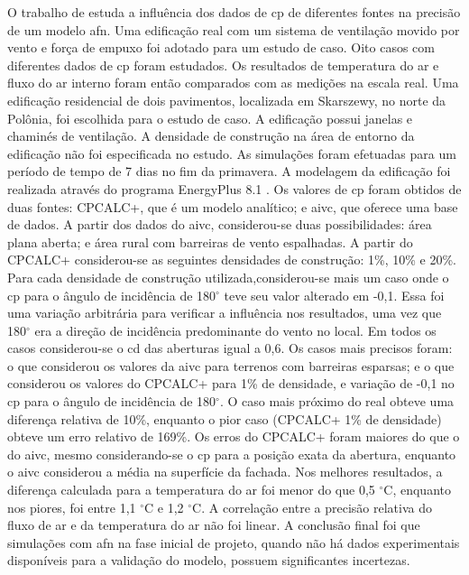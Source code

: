O trabalho de  estuda a influência dos dados de \acrshort{cp} de diferentes fontes na precisão de um modelo \acrshort{afn}. Uma edificação real com um sistema de ventilação movido por vento e força de empuxo foi adotado para um estudo de caso. Oito casos com diferentes dados de \acrshort{cp} foram estudados. Os resultados de temperatura do ar e fluxo do ar interno foram então comparados com as medições na escala real. Uma edificação residencial de dois pavimentos, localizada em Skarszewy, no norte da Polônia, foi escolhida para o estudo de caso. A edificação possui janelas e chaminés de ventilação. A densidade de construção na área de entorno da edificação não foi especificada no estudo. As simulações foram efetuadas para um período de tempo de 7 dias no fim da primavera. 
A modelagem da edificação foi realizada através do programa EnergyPlus 8.1 \cite{EnergyPlus2015}. Os valores de \acrshort{cp} foram obtidos de duas fontes: CPCALC+, que é um modelo analítico; e \acrshort{aivc}, que oferece uma base de dados. A partir dos dados do \acrshort{aivc}, considerou-se duas possibilidades: área plana aberta; e área rural com barreiras de vento espalhadas. A partir do CPCALC+ considerou-se as seguintes densidades de construção: 1\%, 10\% e 20\%. Para cada densidade de construção utilizada,considerou-se mais um caso onde o \acrshort{cp} para o ângulo de incidência de 180$^{\circ}$ teve seu valor alterado em -0,1. Essa foi uma variação arbitrária para verificar a influência nos resultados, uma vez que 180$^{\circ}$ era a direção de incidência predominante do vento no local. Em todos os casos considerou-se o \acrfull{cd} das aberturas igual a 0,6. 
Os casos mais precisos foram: o que considerou os valores da \acrshort{aivc} para terrenos com barreiras esparsas; e o que considerou os valores do CPCALC+ para 1\% de densidade, e variação de -0,1 no \acrshort{cp} para o ângulo de incidência de 180$^{\circ}$. O caso mais próximo do real obteve uma diferença relativa de 10\%, enquanto o pior caso (CPCALC+ 1\% de densidade) obteve um erro relativo de 169\%. Os erros do CPCALC+ foram maiores do que o do \acrshort{aivc}, mesmo considerando-se o \acrshort{cp} para a posição exata da abertura, enquanto o \acrshort{aivc} considerou a média na superfície da fachada. Nos melhores resultados, a diferença calculada para a temperatura do ar foi menor do que 0,5 $^{\circ}$C, enquanto nos piores, foi entre 1,1 $^{\circ}$C e 1,2 $^{\circ}$C. A correlação entre a precisão relativa do fluxo de ar e da temperatura do ar não foi linear. A conclusão final foi que simulações com \acrshort{afn} na fase inicial de projeto, quando não há dados experimentais disponíveis para a validação do modelo, possuem significantes incertezas.

